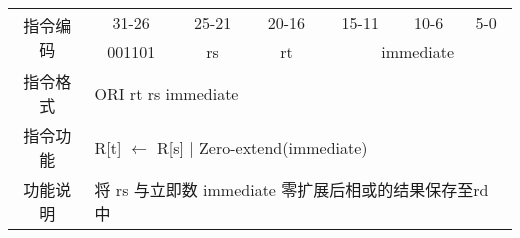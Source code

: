 \documentclass[a4paper,UTF8,fntef]{ctexart}
\begin{document}
	\begin{table}[!hbp]
		\centering
		\begin{tabular}{|c|c|c|c|c|c|c|}
		\hline
		\multirow{2}{*}{指令编码} & 31-26&25-21 & 20-16&15-11 &10-6 &5-0\\
		\cline{2-7} & 001101 & rs & rt & \multicolumn{3}{|c|}{immediate} \\
		\hline
		指令格式&\multicolumn{6}{|l|}{ORI rt rs immediate}\\
		\hline		
		指令功能&\multicolumn{6}{|l|}{R[t] $\leftarrow$  R[s] $|$ Zero-extend(immediate)}\\
		\hline		
		功能说明&\multicolumn{6}{|l|}{将 rs 与立即数 immediate 零扩展后相或的结果保存至rd 中}\\
		\hline
		\end{tabular}
	\end{table}
\newpage
\end{document}
